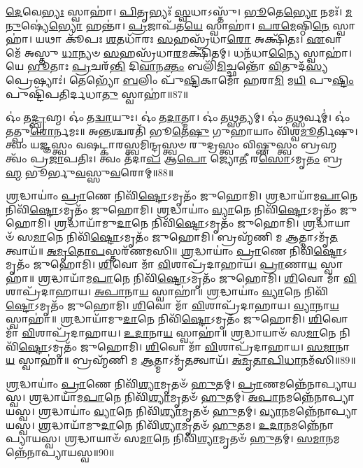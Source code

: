 \-\ul{𑌦𑍇}\-𑌵𑍇\-\ul{𑌭𑍍𑌯𑌃} 𑌸𑍍𑌵𑌾𑌹𑌾॑। 
\-\ul{𑌪𑌿}\-𑌤𑍃𑌭𑍍𑌯𑌃᳴ \ul{𑌸𑍍𑌵}\-𑌧𑌾𑌽𑌸𑍍𑌤𑍁᳴। 
\-\ul{𑌭𑍂}\-𑌤𑍇\-\ul{𑌭𑍍𑌯𑍋} 𑌨𑌮𑌃᳴। 
\-\ul{𑌮}\-\-\ul{𑌨𑍁}\-𑌷𑍍𑌯𑍇॑\-\ul{𑌭𑍍𑌯𑍋} 𑌹𑌨𑍍𑌤𑌾॑। 
\-\ul{𑌪𑍍𑌰}\-𑌜𑌾𑌪᳴𑌤\-\ul{𑌯𑍇} 𑌸𑍍𑌵𑌾𑌹𑌾॑। 
\-\ul{𑌪}\-\-\ul{𑌰}\-\-\ul{𑌮𑍇}\-𑌷𑍍𑌠𑌿\-\ul{𑌨𑍇} 𑌸𑍍𑌵𑌾𑌹𑌾॑। 
𑌯𑌥𑌾 𑌕𑍂᳴𑌪𑌃 \ul{𑌶}\-𑌤𑌧𑌾᳴𑌰𑌃 \ul{𑌸}\-𑌹𑌸𑍍𑌰᳴𑌧𑌾\-\ul{𑌰𑍋} 𑌅𑌕𑍍𑌷𑌿᳴𑌤𑌃। 
\-\ul{𑌏}\-𑌵𑌾 𑌮𑍇᳴ 𑌅𑌸𑍍𑌤𑍁 \ul{𑌧𑌾}\-𑌨𑍍𑌯𑍞 \ul{𑌸}\-𑌹𑌸𑍍𑌰᳴𑌧𑌾\-\ul{𑌰}\-𑌮𑌕𑍍𑌷𑌿᳴𑌤𑌮𑍍। 
𑌧𑌨᳴𑌧𑌾\-\ul{𑌨𑍍𑌯𑍈} 𑌸𑍍𑌵𑌾𑌹𑌾॑। 
𑌯𑍇 \ul{𑌭𑍂}\-𑌤𑌾𑌃 \ul{𑌪𑍍𑌰}\-𑌚𑌰᳴\-\ul{𑌨𑍍𑌤𑌿} 𑌦𑌿\-\ul{𑌵𑌾}\-𑌨\-\ul{𑌕𑍍𑌤𑌂} 𑌬𑌲𑌿᳴\-\ul{𑌮𑌿}\-𑌚𑍍𑌛𑌨𑍍𑌤𑍋᳴ \ul{𑌵𑌿}\-𑌤𑍁𑌦᳴\-\ul{𑌸𑍍𑌯} 𑌪𑍍𑌰𑍇𑌷𑍍𑌯𑌾𑌃॑। 
𑌤𑍇𑌭𑍍𑌯𑍋᳴ \ul{𑌬}\-𑌲𑌿𑌂 𑌪𑍁᳴\-\ul{𑌷𑍍𑌟𑌿}\-𑌕𑌾𑌮𑍋᳴ 𑌹𑌰𑌾\-\ul{𑌮𑌿} 𑌮\-\ul{𑌯𑌿} 𑌪𑍁\-\ul{𑌷𑍍𑌟𑌿𑌂} 𑌪𑍁𑌷𑍍𑌟𑌿᳴𑌪𑌤𑌿𑌰𑍍𑌦𑌧𑌾\-\ul{𑌤𑍁} 𑌸𑍍𑌵𑌾𑌹𑌾॑॥87॥ 
\anuvakamend

𑌓𑌂॑ 𑌤\-\ul{𑌦𑍍𑌬𑍍𑌰}\-𑌹𑍍𑌮। 
𑌓𑌂॑ 𑌤\-\ul{𑌦𑍍𑌵𑌾}\-𑌯𑍁𑌃। 
𑌓𑌂॑ 𑌤\-\ul{𑌦𑌾}\-𑌤𑍍𑌮𑌾। 
𑌓𑌂॑ 𑌤\-\ul{𑌥𑍍𑌸}\-𑌤𑍍𑌯𑌮𑍍‌।
𑌓𑌂॑ 𑌤𑌥𑍍𑌸𑌰𑍍𑌵𑌮𑍍॑‌। 
𑌓𑌂॑ 𑌤𑌤𑍍𑌪𑍁\-\ul{𑌰𑍋}\-𑌰𑍍𑌨𑌮𑌃॥
𑌅𑌨𑍍𑌤𑌶𑍍𑌚𑌰𑌤𑌿᳴ 𑌭𑍂\-\ul{𑌤𑍇}\-\-\ul{𑌷𑍁} 𑌗𑍁𑌹𑌾𑌯𑌾𑌂 𑌵𑌿᳴𑌶𑍍𑌵\-\ul{𑌮𑍂}\-𑌰𑍍𑌤𑌿𑌷𑍁। 
𑌤𑍍𑌵𑌂 𑌯𑌜𑍍𑌞𑌸𑍍𑌤𑍍𑌵𑌂 𑌵𑌷𑌟𑍍𑌕𑌾𑌰𑌸𑍍𑌤𑍍𑌵𑌮𑌿𑌨𑍍𑌦𑍍𑌰𑌸𑍍𑌤𑍍𑌵𑍞 𑌰𑍁𑌦𑍍𑌰𑌸𑍍𑌤𑍍𑌵𑌂 𑌵𑌿𑌷𑍍𑌣𑍁𑌸𑍍𑌤𑍍𑌵𑌂 𑌬𑍍𑌰𑌹𑍍𑌮 𑌤𑍍𑌵𑌂᳴ 𑌪𑍍𑌰\-\ul{𑌜𑌾}\-𑌪𑌤𑌿𑌃।
𑌤𑍍𑌵𑌂 𑌤᳴𑌦𑌾\-\ul{𑌪} 𑌆\-\ul{𑌪𑍋} 𑌜𑍍𑌯𑍋\-\ul{𑌤𑍀} 𑌰\-\ul{𑌸𑍋}\-𑌽𑌮𑍃\-\ul{𑌤𑌂} 𑌬𑍍𑌰\-\ul{𑌹𑍍𑌮} 𑌭𑍂𑌰𑍍𑌭𑍁\-\ul{𑌵}\-𑌸𑍍𑌸𑍁\-\ul{𑌵}\-𑌰𑍋𑌮𑍍‌॥88॥
\anuvakamend

\-\ul{𑌶𑍍𑌰}\-𑌦𑍍𑌧𑌾𑌯𑌾𑌂॑ \ul{𑌪𑍍𑌰𑌾}\-𑌣𑍇 𑌨𑌿𑌵𑌿᳴\-\ul{𑌷𑍍𑌟𑍋}\-𑌽𑌮𑍃𑌤𑌂᳴ 𑌜𑍁𑌹𑍋𑌮𑌿। 
\-\ul{𑌶𑍍𑌰}\-𑌦𑍍𑌧𑌾𑌯𑌾᳴𑌮\-\ul{𑌪𑌾}\-𑌨𑍇 𑌨𑌿𑌵𑌿᳴\-\ul{𑌷𑍍𑌟𑍋}\-𑌽𑌮𑍃𑌤𑌂᳴ 𑌜𑍁𑌹𑍋𑌮𑌿। 
\-\ul{𑌶𑍍𑌰}\-𑌦𑍍𑌧𑌾𑌯𑌾𑌂॑ \ul{𑌵𑍍𑌯𑌾}\-𑌨𑍇 𑌨𑌿𑌵𑌿᳴\-\ul{𑌷𑍍𑌟𑍋}\-𑌽𑌮𑍃𑌤𑌂᳴ 𑌜𑍁𑌹𑍋𑌮𑌿। 
\-\ul{𑌶𑍍𑌰}\-𑌦𑍍𑌧𑌾𑌯𑌾᳴𑌮𑍁\-\ul{𑌦𑌾}\-𑌨𑍇 𑌨𑌿𑌵𑌿᳴\-\ul{𑌷𑍍𑌟𑍋}\-𑌽𑌮𑍃𑌤𑌂᳴ 𑌜𑍁𑌹𑍋𑌮𑌿। 
\-\ul{𑌶𑍍𑌰}\-𑌦𑍍𑌧𑌾𑌯𑌾𑍞᳴ 𑌸\-\ul{𑌮𑌾}\-𑌨𑍇 𑌨𑌿𑌵𑌿᳴\-\ul{𑌷𑍍𑌟𑍋}\-𑌽𑌮𑍃𑌤𑌂᳴ 𑌜𑍁𑌹𑍋𑌮𑌿। 
𑌬𑍍𑌰𑌹𑍍𑌮᳴𑌣𑌿 𑌮 \ul{𑌆}\-𑌤𑍍𑌮𑌾𑌽𑌮𑍃᳴\-\ul{𑌤}\-𑌤𑍍𑌵𑌾𑌯᳴॥ 
\-\ul{𑌅}\-\-\ul{𑌮𑍃}\-\-\ul{𑌤𑍋}\-\-\ul{𑌪}\-𑌸𑍍𑌤𑌰᳴𑌣𑌮𑌸𑌿॥ 
\-\ul{𑌶𑍍𑌰}\-𑌦𑍍𑌧𑌾𑌯𑌾𑌂॑ \ul{𑌪𑍍𑌰𑌾}\-𑌣𑍇 𑌨𑌿𑌵𑌿᳴\-\ul{𑌷𑍍𑌟𑍋}\-𑌽𑌮𑍃𑌤𑌂᳴ 𑌜𑍁𑌹𑍋𑌮𑌿। 
\-\ul{𑌶𑌿}\-𑌵𑍋 𑌮𑌾᳴ \ul{𑌵𑌿}\-𑌶𑌾𑌪𑍍𑌰᳴𑌦𑌾𑌹𑌾𑌯। 
\-\ul{𑌪𑍍𑌰𑌾}\-𑌣𑌾\-\ul{𑌯} 𑌸𑍍𑌵𑌾𑌹𑌾॑॥ 
\-\ul{𑌶𑍍𑌰}\-𑌦𑍍𑌧𑌾𑌯𑌾᳴𑌮\-\ul{𑌪𑌾}\-𑌨𑍇 𑌨𑌿𑌵𑌿᳴\-\ul{𑌷𑍍𑌟𑍋}\-𑌽𑌮𑍃𑌤𑌂᳴ 𑌜𑍁𑌹𑍋𑌮𑌿। 
\-\ul{𑌶𑌿}\-𑌵𑍋 𑌮𑌾᳴ \ul{𑌵𑌿}\-𑌶𑌾𑌪𑍍𑌰᳴𑌦𑌾𑌹𑌾𑌯। 
\-\ul{𑌅}\-\-\ul{𑌪𑌾}\-𑌨𑌾\-\ul{𑌯} 𑌸𑍍𑌵𑌾𑌹𑌾॑॥ 
\-\ul{𑌶𑍍𑌰}\-𑌦𑍍𑌧𑌾𑌯𑌾𑌂॑ \ul{𑌵𑍍𑌯𑌾}\-𑌨𑍇 𑌨𑌿𑌵𑌿᳴\-\ul{𑌷𑍍𑌟𑍋}\-𑌽𑌮𑍃𑌤𑌂᳴ 𑌜𑍁𑌹𑍋𑌮𑌿। 
\-\ul{𑌶𑌿}\-𑌵𑍋 𑌮𑌾᳴ \ul{𑌵𑌿}\-𑌶𑌾𑌪𑍍𑌰᳴𑌦𑌾𑌹𑌾𑌯। 
\-\ul{𑌵𑍍𑌯𑌾}\-𑌨𑌾\-\ul{𑌯} 𑌸𑍍𑌵𑌾𑌹𑌾॑॥ 
\-\ul{𑌶𑍍𑌰}\-𑌦𑍍𑌧𑌾𑌯𑌾᳴𑌮𑍁\-\ul{𑌦𑌾}\-𑌨𑍇 𑌨𑌿𑌵𑌿᳴\-\ul{𑌷𑍍𑌟𑍋}\-𑌽𑌮𑍃𑌤𑌂᳴ 𑌜𑍁𑌹𑍋𑌮𑌿। 
\-\ul{𑌶𑌿}\-𑌵𑍋 𑌮𑌾᳴ \ul{𑌵𑌿}\-𑌶𑌾𑌪𑍍𑌰᳴𑌦𑌾𑌹𑌾𑌯। 
\-\ul{𑌉}\-\-\ul{𑌦𑌾}\-𑌨𑌾\-\ul{𑌯} 𑌸𑍍𑌵𑌾𑌹𑌾॑॥ 
\-\ul{𑌶𑍍𑌰}\-𑌦𑍍𑌧𑌾𑌯𑌾𑍞᳴ 𑌸\-\ul{𑌮𑌾}\-𑌨𑍇 𑌨𑌿𑌵𑌿᳴\-\ul{𑌷𑍍𑌟𑍋}\-𑌽𑌮𑍃𑌤𑌂᳴ 𑌜𑍁𑌹𑍋𑌮𑌿। 
\-\ul{𑌶𑌿}\-𑌵𑍋 𑌮𑌾᳴ \ul{𑌵𑌿}\-𑌶𑌾𑌪𑍍𑌰᳴𑌦𑌾𑌹𑌾𑌯। 
\-\ul{𑌸}\-\-\ul{𑌮𑌾}\-𑌨𑌾\-\ul{𑌯} 𑌸𑍍𑌵𑌾𑌹𑌾॑॥ 
𑌬𑍍𑌰𑌹𑍍𑌮᳴𑌣𑌿 𑌮 \ul{𑌆}\-𑌤𑍍𑌮𑌾𑌽𑌮𑍃᳴\-\ul{𑌤}\-𑌤𑍍𑌵𑌾𑌯᳴। 
\-\ul{𑌅}\-\-\ul{𑌮𑍃}\-\-\ul{𑌤𑌾}\-\-\ul{𑌪𑌿}\-\-\ul{𑌧𑌾}\-𑌨𑌮᳴𑌸𑌿॥89॥
 \anuvakamend


\-\ul{𑌶𑍍𑌰}\-𑌦𑍍𑌧𑌾𑌯𑌾𑌂॑ \ul{𑌪𑍍𑌰𑌾}\-𑌣𑍇 𑌨𑌿𑌵𑌿᳴\-\ul{𑌶𑍍𑌯𑌾}\-𑌮𑍃𑌤𑍞᳴ \ul{𑌹𑍁}\-𑌤𑌮𑍍। 
\-\ul{𑌪𑍍𑌰𑌾}\-𑌣𑌮𑌨𑍍𑌨𑍇᳴𑌨𑌾𑌪𑍍𑌯𑌾𑌯𑌸𑍍𑌵। 
\-\ul{𑌶𑍍𑌰}\-𑌦𑍍𑌧𑌾𑌯𑌾᳴𑌮\-\ul{𑌪𑌾}\-𑌨𑍇 𑌨𑌿𑌵𑌿᳴\-\ul{𑌶𑍍𑌯𑌾}\-𑌮𑍃𑌤𑍞᳴ \ul{𑌹𑍁}\-𑌤𑌮𑍍। 
\-\ul{𑌅}\-\-\ul{𑌪𑌾}\-𑌨𑌮𑌨𑍍𑌨𑍇᳴𑌨𑌾𑌪𑍍𑌯𑌾𑌯𑌸𑍍𑌵।
\-\ul{𑌶𑍍𑌰}\-𑌦𑍍𑌧𑌾𑌯𑌾𑌂॑ \ul{𑌵𑍍𑌯𑌾}\-𑌨𑍇 𑌨𑌿𑌵𑌿᳴\-\ul{𑌶𑍍𑌯𑌾}\-𑌮𑍃𑌤𑍞᳴ \ul{𑌹𑍁}\-𑌤𑌮𑍍। 
\-\ul{𑌵𑍍𑌯𑌾}\-𑌨𑌮𑌨𑍍𑌨𑍇᳴𑌨𑌾𑌪𑍍𑌯𑌾𑌯𑌸𑍍𑌵। 
\-\ul{𑌶𑍍𑌰}\-𑌦𑍍𑌧𑌾𑌯𑌾᳴𑌮𑍁\-\ul{𑌦𑌾}\-𑌨𑍇 𑌨𑌿𑌵𑌿᳴\-\ul{𑌶𑍍𑌯𑌾}\-𑌮𑍃𑌤𑍞᳴ \ul{𑌹𑍁}\-𑌤𑌮। 
\-\ul{𑌉}\-\-\ul{𑌦𑌾}\-𑌨𑌮𑌨𑍍𑌨𑍇᳴𑌨𑌾𑌪𑍍𑌯𑌾𑌯𑌸𑍍𑌵।
\-\ul{𑌶𑍍𑌰}\-𑌦𑍍𑌧𑌾𑌯𑌾𑍞᳴ 𑌸\-\ul{𑌮𑌾}\-𑌨𑍇 𑌨𑌿𑌵𑌿᳴\-\ul{𑌶𑍍𑌯𑌾}\-𑌮𑍃𑌤𑍞᳴ \ul{𑌹𑍁}\-𑌤𑌮𑍍। 
\-\ul{𑌸}\-\-\ul{𑌮𑌾}\-𑌨𑌮𑌨𑍍𑌨𑍇᳴𑌨𑌾𑌪𑍍𑌯𑌾\-𑌯𑌸𑍍𑌵॥90॥\anuvakamend

